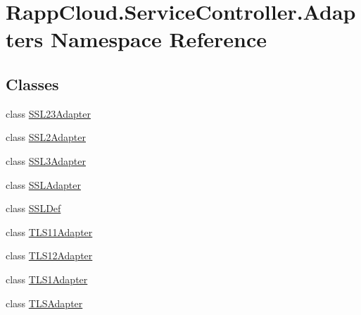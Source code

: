 \hypertarget{namespaceRappCloud_1_1ServiceController_1_1Adapters}{\section{Rapp\-Cloud.\-Service\-Controller.\-Adapters Namespace Reference}
\label{namespaceRappCloud_1_1ServiceController_1_1Adapters}
}
\subsection*{Classes}
\begin{DoxyCompactItemize}
\item 
class \hyperlink{classRappCloud_1_1ServiceController_1_1Adapters_1_1SSL23Adapter}{S\-S\-L23\-Adapter}
\item 
class \hyperlink{classRappCloud_1_1ServiceController_1_1Adapters_1_1SSL2Adapter}{S\-S\-L2\-Adapter}
\item 
class \hyperlink{classRappCloud_1_1ServiceController_1_1Adapters_1_1SSL3Adapter}{S\-S\-L3\-Adapter}
\item 
class \hyperlink{classRappCloud_1_1ServiceController_1_1Adapters_1_1SSLAdapter}{S\-S\-L\-Adapter}
\item 
class \hyperlink{classRappCloud_1_1ServiceController_1_1Adapters_1_1SSLDef}{S\-S\-L\-Def}
\item 
class \hyperlink{classRappCloud_1_1ServiceController_1_1Adapters_1_1TLS11Adapter}{T\-L\-S11\-Adapter}
\item 
class \hyperlink{classRappCloud_1_1ServiceController_1_1Adapters_1_1TLS12Adapter}{T\-L\-S12\-Adapter}
\item 
class \hyperlink{classRappCloud_1_1ServiceController_1_1Adapters_1_1TLS1Adapter}{T\-L\-S1\-Adapter}
\item 
class \hyperlink{classRappCloud_1_1ServiceController_1_1Adapters_1_1TLSAdapter}{T\-L\-S\-Adapter}
\end{DoxyCompactItemize}
